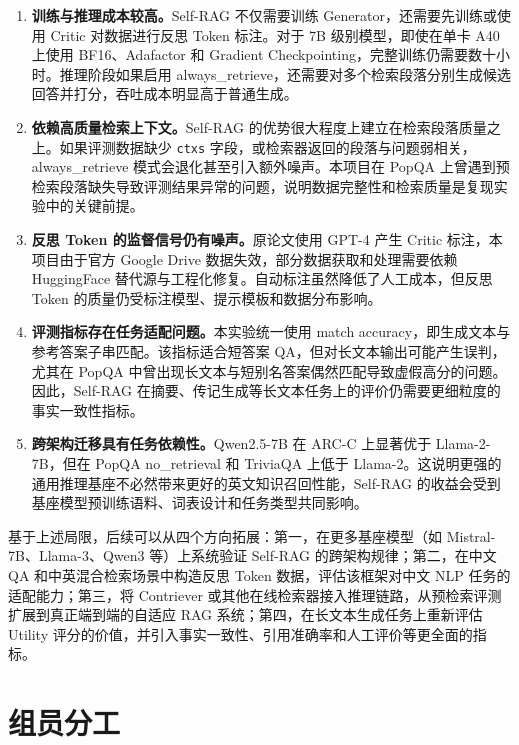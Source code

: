 \documentclass[11pt,a4paper]{article}
\begin{document}
\begin{enumerate}[leftmargin=2em]
    \item \textbf{训练与推理成本较高。}Self-RAG 不仅需要训练 Generator，还需要先训练或使用 Critic 对数据进行反思 Token 标注。对于 7B 级别模型，即使在单卡 A40 上使用 BF16、Adafactor 和 Gradient Checkpointing，完整训练仍需要数十小时。推理阶段如果启用 always\_retrieve，还需要对多个检索段落分别生成候选回答并打分，吞吐成本明显高于普通生成。

    \item \textbf{依赖高质量检索上下文。}Self-RAG 的优势很大程度上建立在检索段落质量之上。如果评测数据缺少 \texttt{ctxs} 字段，或检索器返回的段落与问题弱相关，always\_retrieve 模式会退化甚至引入额外噪声。本项目在 PopQA 上曾遇到预检索段落缺失导致评测结果异常的问题，说明数据完整性和检索质量是复现实验中的关键前提。

    \item \textbf{反思 Token 的监督信号仍有噪声。}原论文使用 GPT-4 产生 Critic 标注，本项目由于官方 Google Drive 数据失效，部分数据获取和处理需要依赖 HuggingFace 替代源与工程化修复。自动标注虽然降低了人工成本，但反思 Token 的质量仍受标注模型、提示模板和数据分布影响。

    \item \textbf{评测指标存在任务适配问题。}本实验统一使用 match accuracy，即生成文本与参考答案子串匹配。该指标适合短答案 QA，但对长文本输出可能产生误判，尤其在 PopQA 中曾出现长文本与短别名答案偶然匹配导致虚假高分的问题。因此，Self-RAG 在摘要、传记生成等长文本任务上的评价仍需要更细粒度的事实一致性指标。

    \item \textbf{跨架构迁移具有任务依赖性。}Qwen2.5-7B 在 ARC-C 上显著优于 Llama-2-7B，但在 PopQA no\_retrieval 和 TriviaQA 上低于 Llama-2。这说明更强的通用推理基座不必然带来更好的英文知识召回性能，Self-RAG 的收益会受到基座模型预训练语料、词表设计和任务类型共同影响。
\end{enumerate}

基于上述局限，后续可以从四个方向拓展：第一，在更多基座模型（如 Mistral-7B、Llama-3、Qwen3 等）上系统验证 Self-RAG 的跨架构规律；第二，在中文 QA 和中英混合检索场景中构造反思 Token 数据，评估该框架对中文 NLP 任务的适配能力；第三，将 Contriever 或其他在线检索器接入推理链路，从预检索评测扩展到真正端到端的自适应 RAG 系统；第四，在长文本生成任务上重新评估 Utility 评分的价值，并引入事实一致性、引用准确率和人工评价等更全面的指标。

\section{组员分工}
\label{sec:contribution}
\end{document}
